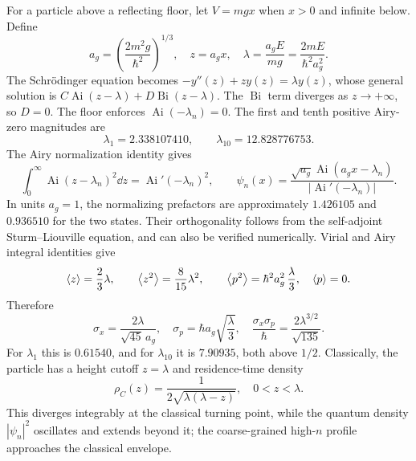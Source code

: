 For a particle above a reflecting floor, let
$V=mgx$ when $x>0$ and infinite below.
Define
\begin{equation}
a_g=\left(\frac{2m^2g}{\hbar^2}\right)^{1/3},
\quad z=a_gx,\quad
\lambda=\frac{a_gE}{mg}
=\frac{2mE}{\hbar^2a_g^2}.
\end{equation}
The Schrödinger equation becomes
$-y''(z)+zy(z)=\lambda y(z)$,
whose general solution is
$C\operatorname{Ai}(z-\lambda)+
D\operatorname{Bi}(z-\lambda)$.
The $\operatorname{Bi}$ term diverges as
$z\to+\infty$, so $D=0$. The floor enforces
$\operatorname{Ai}(-\lambda_n)=0$.
The first and tenth positive Airy-zero magnitudes
are
\begin{equation}
\boxed{\lambda_1=2.338107410,\qquad
\lambda_{10}=12.828776753}.
\end{equation}
The Airy normalization identity gives
\begin{equation}
\int_0^\infty\operatorname{Ai}(z-\lambda_n)^2\dd z
=\operatorname{Ai}'(-\lambda_n)^2,
\qquad
\boxed{\psi_n(x)=
\frac{\sqrt{a_g}\operatorname{Ai}(a_gx-\lambda_n)}
{|\operatorname{Ai}'(-\lambda_n)|}}.
\end{equation}
In units $a_g=1$, the normalizing
prefactors are approximately $1.426105$
and $0.936510$ for the two states.
Their orthogonality follows from the
self-adjoint Sturm--Liouville equation,
and can also be verified numerically.
Virial and Airy integral identities give
\begin{equation}
\left\langle z\right\rangle=\frac23\lambda,\qquad
\left\langle z^2\right\rangle=\frac8{15}\lambda^2,\qquad
\left\langle p^2\right\rangle=\hbar^2a_g^2\,\frac{\lambda}{3},
\quad\left\langle p\right\rangle=0.
\end{equation}
Therefore
\begin{equation}
\boxed{\sigma_x=\frac{2\lambda}{\sqrt{45}\,a_g},
\quad \sigma_p=\hbar a_g\sqrt{\frac{\lambda}{3}},
\quad \frac{\sigma_x\sigma_p}{\hbar}
=\frac{2\lambda^{3/2}}{\sqrt{135}}}.
\end{equation}
For $\lambda_1$ this is $0.61540$, and
for $\lambda_{10}$ it is $7.90935$,
both above $1/2$.
Classically, the particle has a height cutoff
$z=\lambda$ and residence-time density
\begin{equation}
\boxed{\rho_C(z)=\frac1{2\sqrt{\lambda(\lambda-z)}}},
\quad0<z<\lambda.
\end{equation}
This diverges integrably at the classical
turning point, while the quantum density
$|\psi_n|^2$ oscillates and extends
beyond it; the coarse-grained high-$n$
profile approaches the classical envelope.

